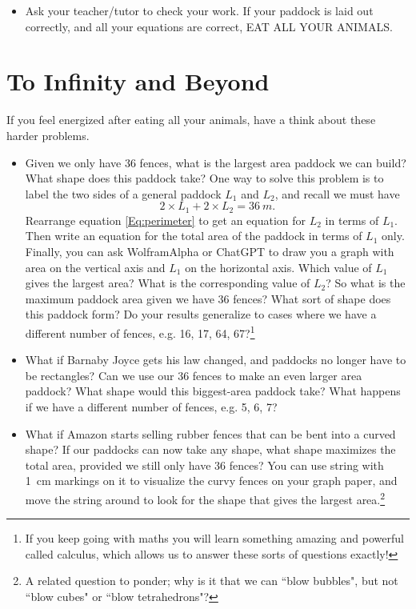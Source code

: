 \documentclass{article}
\begin{document}
\begin{itemize}
{\begin{equation}
18 \div 4 = 4 + \frac{2}{4}.
\end{equation}
Repeat this exercise with different numbers of starting cards and different numbers of players, writing out the corresponding equation each time. You can also ask you tutor for other ways of visualizing division!}

\item 
Ask your teacher/tutor to check your work. If your paddock is laid out correctly, and all your equations are correct, EAT ALL YOUR ANIMALS.
\end{itemize}

\section{To Infinity and Beyond}
If you feel energized after eating all your animals, have a think about these harder problems.
\begin{itemize}
\item
Given we only have 36 fences, what is the largest area paddock we can build? What shape does this paddock take? One way to solve this problem is to label the two sides of a general paddock $L_1$ and $L_2$, and recall we must have 
\begin{equation}
2\times L_1 + 2\times L_2 = \SI{36}{m}. \label{Eq:perimeter}
\end{equation} 
Rearrange equation \eqref{Eq:perimeter} to get an equation for $L_2$ in terms of $L_1$. Then write an equation for the total area of the paddock in terms of $L_1$ only. Finally, you can ask WolframAlpha or ChatGPT to draw you a graph with area on the vertical axis and $L_1$ on the horizontal axis. Which value of $L_1$ gives the largest area? What is the corresponding value of $L_2$? So what is the maximum paddock area given we have 36 fences? What sort of shape does this paddock form? Do your results generalize to cases where we have a different number of fences, e.g. 16, 17, 64, 67?\footnote{If you keep going with maths you will learn something amazing and powerful called calculus, which allows us to answer these sorts of questions exactly!}
\item 
What if Barnaby Joyce gets his law changed, and paddocks no longer have to be rectangles? Can we use our 36 fences to make an even larger area paddock? What shape would this biggest-area paddock take? What happens if we have a different number of fences, e.g. 5, 6, 7?
\item
What if Amazon starts selling rubber fences that can be bent into a curved shape? If our paddocks can now take any shape, what shape maximizes the total area, provided we still only have 36 fences? You can use string with \SI{1}{\centi\meter} markings on it to visualize the curvy fences on your graph paper, and move the string around to look for the shape that gives the largest area.\footnote{A related question to ponder; why is it that we can ``blow bubbles", but not ``blow cubes" or ``blow tetrahedrons"?}
\end{itemize}
\end{document}
